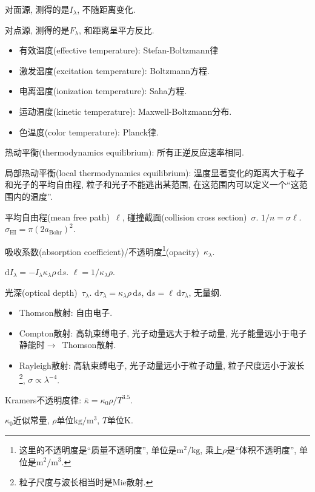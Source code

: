 对面源, 测得的是$I_\lambda$, 不随距离变化.

对点源, 测得的是$F_\lambda$, 和距离呈平方反比.

\begin{itemize}
    \item 有效温度(effective temperature): Stefan-Boltzmann律
    \item 激发温度(excitation temperature): Boltzmann方程.
    \item 电离温度(ionization temperature): Saha方程.
    \item 运动温度(kinetic temperature): Maxwell-Boltzmann分布.
    \item 色温度(color temperature): Planck律.
\end{itemize}

热动平衡(thermodynamics equilibrium): 所有正逆反应速率相同.

局部热动平衡(local thermodynamics equilibrium): 温度显著变化的距离大于粒子和光子的平均自由程, 粒子和光子不能逃出某范围, 在这范围内可以定义一个``这范围内的温度''.

平均自由程(mean free path)~$\ell$, 碰撞截面(collision cross section)~$\sigma$. $1/n=\sigma\ell$. $\sigma_\text{HI}=\pi(2a_\text{Bohr})^2$.

吸收系数(absorption coefficient)/不透明度\footnote{
    这里的不透明度是``质量不透明度'', 单位是$\text{m}^2/\text{kg}$, 乘上$\rho$是``体积不透明度'', 单位是$\text{m}^2/\text{m}^3$.
}(opacity)~$\kappa_\lambda$.

$\mathrm{d}I_\lambda
=-I_\lambda\kappa_\lambda\rho\,\mathrm{d}s$.
$\ell=1/\kappa_\lambda\rho$.

光深(optical depth)~$\tau_\lambda$.
$\mathrm{d}\tau_\lambda=\kappa_\lambda\rho\,\mathrm{d}s$, $\mathrm{d}s=\ell\,\mathrm{d}\tau_\lambda$, 无量纲.

\begin{itemize}
    \item Thomson散射: 自由电子.
    \item Compton散射: 高轨束缚电子, 光子动量远大于粒子动量, 光子能量远小于电子静能时$\to$~Thomson散射.
    \item Rayleigh散射: 高轨束缚电子, 光子动量远小于粒子动量, 粒子尺度远小于波长\footnote{粒子尺度与波长相当时是Mie散射.}, $\sigma \propto \lambda^{-4}$.
\end{itemize}

Kramers不透明度律: $\bar{\kappa}=\kappa_0\rho/T^{3.5}$.

$\kappa_0$近似常量, $\rho$单位$\text{kg}/\text{m}^3$, $T$单位$\text{K}$.

